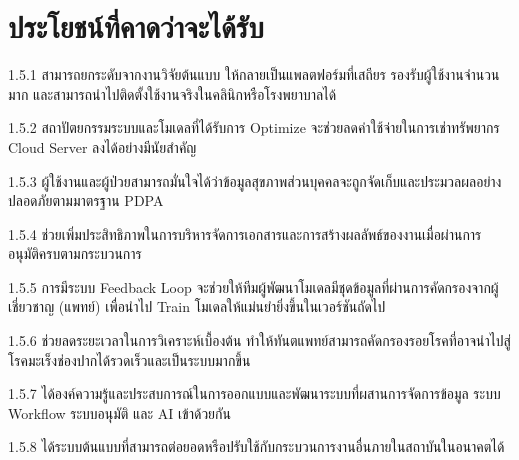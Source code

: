 \section{ประโยชน์ที่คาดว่าจะได้รับ}

    1.5.1 สามารถยกระดับจากงานวิจัยต้นแบบ ให้กลายเป็นแพลตฟอร์มที่เสถียร รองรับผู้ใช้งานจำนวนมาก และสามารถนำไปติดตั้งใช้งานจริงในคลินิกหรือโรงพยาบาลได้

    1.5.2 สถาปัตยกรรมระบบและโมเดลที่ได้รับการ Optimize จะช่วยลดค่าใช้จ่ายในการเช่าทรัพยากร Cloud Server ลงได้อย่างมีนัยสำคัญ

    1.5.3 ผู้ใช้งานและผู้ป่วยสามารถมั่นใจได้ว่าข้อมูลสุขภาพส่วนบุคคลจะถูกจัดเก็บและประมวลผลอย่างปลอดภัยตามมาตรฐาน PDPA

    1.5.4 ช่วยเพิ่มประสิทธิภาพในการบริหารจัดการเอกสารและการสร้างผลลัพธ์ของงานเมื่อผ่านการอนุมัติครบตามกระบวนการ

    1.5.5 การมีระบบ Feedback Loop จะช่วยให้ทีมผู้พัฒนาโมเดลมีชุดข้อมูลที่ผ่านการคัดกรองจากผู้เชี่ยวชาญ (แพทย์) เพื่อนำไป Train โมเดลให้แม่นยำยิ่งขึ้นในเวอร์ชันถัดไป

    1.5.6 ช่วยลดระยะเวลาในการวิเคราะห์เบื้องต้น ทำให้ทันตแพทย์สามารถคัดกรองรอยโรคที่อาจนำไปสู่โรคมะเร็งช่องปากได้รวดเร็วและเป็นระบบมากขึ้น

    1.5.7 ได้องค์ความรู้และประสบการณ์ในการออกแบบและพัฒนาระบบที่ผสานการจัดการข้อมูล ระบบ Workflow ระบบอนุมัติ และ AI เข้าด้วยกัน

    1.5.8 ได้ระบบต้นแบบที่สามารถต่อยอดหรือปรับใช้กับกระบวนการงานอื่นภายในสถาบันในอนาคตได้

